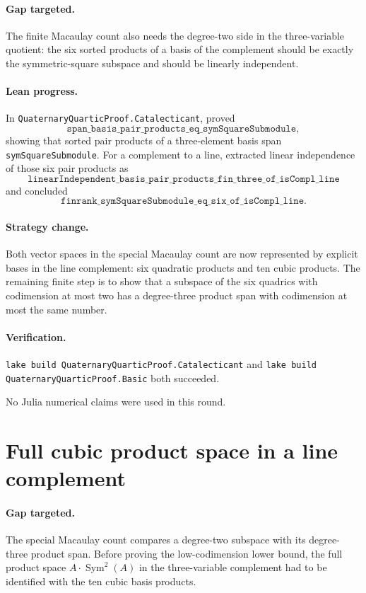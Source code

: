 \documentclass[11pt]{article}
\begin{document}
\paragraph{Gap targeted.}
The finite Macaulay count also needs the degree-two side in the
three-variable quotient: the six sorted products of a basis of the complement
should be exactly the symmetric-square subspace and should be linearly
independent.

\paragraph{Lean progress.}
In \texttt{QuaternaryQuarticProof.Catalecticant}, proved
\[
\texttt{span\_basis\_pair\_products\_eq\_symSquareSubmodule},
\]
showing that sorted pair products of a three-element basis span
\texttt{symSquareSubmodule}.  For a complement to a line, extracted linear
independence of those six pair products as
\[
\texttt{linearIndependent\_basis\_pair\_products\_fin\_three\_of\_isCompl\_line}
\]
and concluded
\[
\texttt{finrank\_symSquareSubmodule\_eq\_six\_of\_isCompl\_line}.
\]

\paragraph{Strategy change.}
Both vector spaces in the special Macaulay count are now represented by
explicit bases in the line complement: six quadratic products and ten cubic
products.  The remaining finite step is to show that a subspace of the six
quadrics with codimension at most two has a degree-three product span with
codimension at most the same number.

\paragraph{Verification.}
\texttt{lake build QuaternaryQuarticProof.Catalecticant} and
\texttt{lake build QuaternaryQuarticProof.Basic} both succeeded.

No Julia numerical claims were used in this round.

\section*{Full cubic product space in a line complement}

\paragraph{Gap targeted.}
The special Macaulay count compares a degree-two subspace with its
degree-three product span.  Before proving the low-codimension lower bound,
the full product space \(A\cdot\operatorname{Sym}^2(A)\) in the
three-variable complement had to be identified with the ten cubic basis
products.
\end{document}
